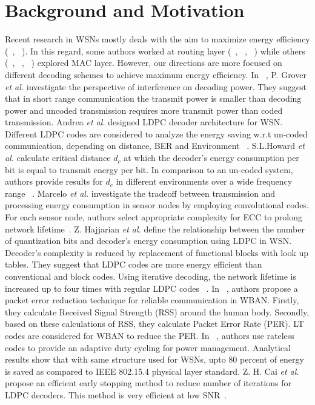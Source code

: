 \documentclass[3p,times,procedia]{elsarticle}
\begin{document}
\section{Background and Motivation}
\label{sec:format}
Recent research in WSNs mostly deals with the aim to maximize energy efficiency (~\cite{1}, ~\cite{2}). In this regard, some authors worked at routing layer (~\cite{3}, ~\cite{4}, ~\cite{5}) while others (~\cite{6}, ~\cite{7}, ~\cite{8}) explored MAC layer. However, our directions are more focused on different decoding schemes to achieve maximum energy efficiency. In ~\cite{9}, P. Grover \textit{et al.} investigate the perspective of interference on decoding power. They suggest that in short range communication the transmit power is smaller than decoding power and uncoded transmission requires more transmit power than coded transmission. Andrea \textit{et al.} designed LDPC decoder architecture for WSN. Different LDPC codes are considered to analyze the energy saving w.r.t un-coded communication, depending on distance, BER and Environment ~\cite{10}.
S.L.Howard \textit{et al.} calculate critical distance $d_c$ at which the decoder's energy consumption per bit is equal to transmit energy per bit. In comparison to an un-coded system, authors provide results for $d_c$ in different environments over a wide frequency range ~\cite{11}. Marcelo \textit{et al.} investigate the tradeoff between transmission and processing energy consumption in sensor nodes by employing convolutional codes. For each sensor node, authors select appropriate complexity for ECC to prolong network lifetime~\cite{12}. Z. Hajjarian \textit{et al.} define the relationship between the number of quantization bits and decoder's energy consumption using LDPC in WSN. Decoder's complexity is reduced by replacement of functional blocks with look up tables. They suggest that LDPC codes are more energy efficient than conventional and block codes. Using iterative decoding, the network lifetime is increased up to four times with regular LDPC codes ~\cite{13}. In ~\cite{14}, authors propose a packet error reduction technique for reliable communication in WBAN. Firstly, they calculate Received Signal Strength (RSS) around the human body. Secondly, based on these calculations of RSS, they calculate Packet Error Rate (PER). LT codes are considered for WBAN to reduce the PER. In ~\cite{15}, authors use rateless codes to provide an adaptive duty cycling for power management. Analytical results show that with same structure used for WSNs, upto $80$ percent of energy is saved as compared to IEEE 802.15.4 physical layer standard. Z. H. Cai \textit{et al.} propose an efficient early stopping method to reduce number of iterations for LDPC decoders. This method is very efficient at low SNR~\cite{16}.
\end{document}

